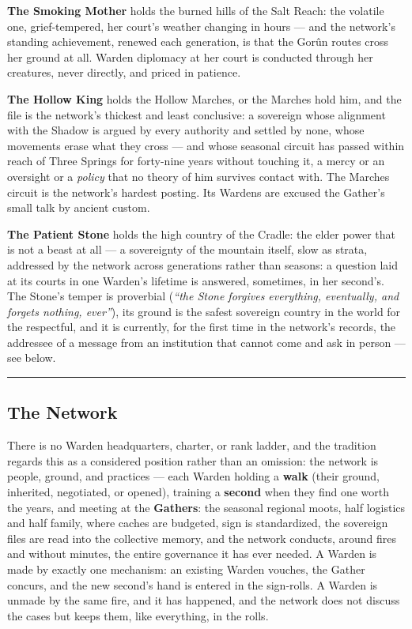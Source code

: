 \textbf{The Smoking Mother} holds the burned hills of the Salt Reach: the volatile one, grief-tempered, her court's weather changing in hours --- and the network's standing achievement, renewed each generation, is that the Gorûn routes cross her ground at all. Warden diplomacy at her court is conducted through her creatures, never directly, and priced in patience.

\textbf{The Hollow King} holds the Hollow Marches, or the Marches hold him, and the file is the network's thickest and least conclusive: a sovereign whose alignment with the Shadow is argued by every authority and settled by none, whose movements erase what they cross --- and whose seasonal circuit has passed within reach of Three Springs for forty-nine years without touching it, a mercy or an oversight or a \textit{policy} that no theory of him survives contact with. The Marches circuit is the network's hardest posting. Its Wardens are excused the Gather's small talk by ancient custom.

\textbf{The Patient Stone} holds the high country of the Cradle: the elder power that is not a beast at all --- a sovereignty of the mountain itself, slow as strata, addressed by the network across generations rather than seasons: a question laid at its courts in one Warden's lifetime is answered, sometimes, in her second's. The Stone's temper is proverbial (\textit{``the Stone forgives everything, eventually, and forgets nothing, ever''}), its ground is the safest sovereign country in the world for the respectful, and it is currently, for the first time in the network's records, the addressee of a message from an institution that cannot come and ask in person --- see below.

\medskip\hrule\medskip

\subsection{The Network}

There is no Warden headquarters, charter, or rank ladder, and the tradition regards this as a considered position rather than an omission: the network is people, ground, and practices --- each Warden holding a \textbf{walk} (their ground, inherited, negotiated, or opened), training a \textbf{second} when they find one worth the years, and meeting at the \textbf{Gathers}: the seasonal regional moots, half logistics and half family, where caches are budgeted, sign is standardized, the sovereign files are read into the collective memory, and the network conducts, around fires and without minutes, the entire governance it has ever needed. A Warden is made by exactly one mechanism: an existing Warden vouches, the Gather concurs, and the new second's hand is entered in the sign-rolls. A Warden is unmade by the same fire, and it has happened, and the network does not discuss the cases but keeps them, like everything, in the rolls.

